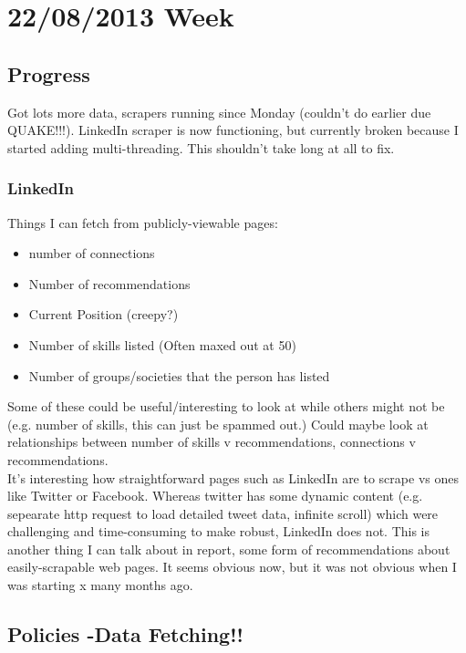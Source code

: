 \chapter{22/08/2013 Week}\label{C:us}

\section{Progress}

Got lots more data, scrapers running since Monday (couldn't do earlier due QUAKE!!!). LinkedIn scraper is now functioning, but currently broken because I started adding multi-threading. This shouldn't take long at all to fix. 

\subsection{LinkedIn}
Things I can fetch from publicly-viewable pages: 

\begin{itemize}
 \item number of connections
 \item Number of recommendations
 \item Current Position (creepy?)
 \item Number of skills listed (Often maxed out at 50)
 \item Number of groups/societies that the person has listed
\end{itemize}

\noindent Some of these could be useful/interesting to look at while others might not be (e.g. number of skills, this can just be spammed out.) Could maybe look at relationships between number of skills v recommendations, connections v recommendations.\\

\noindent It's interesting how straightforward pages such as LinkedIn are to scrape vs ones like Twitter or Facebook. Whereas twitter has some dynamic content (e.g. sepearate http request to load detailed tweet data, infinite scroll) which were challenging and time-consuming to make robust, LinkedIn does not. This is another thing I can talk about in report, some form of recommendations about easily-scrapable web pages. It seems obvious now, but it was not obvious when I was starting x many months ago. 

\section{Policies -Data Fetching!!}

